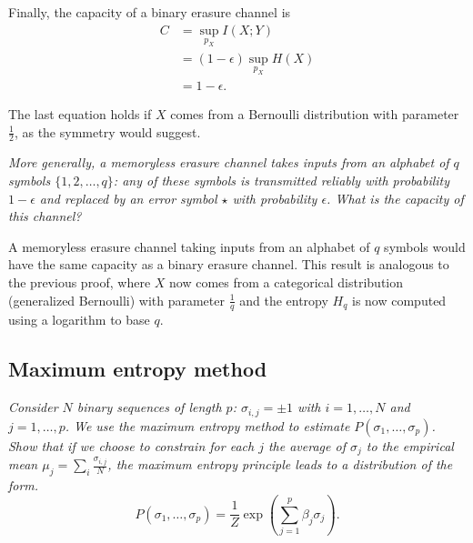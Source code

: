 \documentclass[12pt]{article}
\begin{document}
  Finally, the capacity of a binary erasure channel is
  \begin{equation}
    \begin{split}
      C &= \sup_{p_X} I(X; Y)\\
      &= (1 - \epsilon) \sup_{p_X} H(X)\\
      &= 1 - \epsilon.
    \end{split}
  \end{equation}

  The last equation holds if $X$ comes from a Bernoulli distribution with
  parameter $\frac{1}{2}$, as the symmetry would suggest.

  \begin{displayquote}
    \itshape{}
    More generally, a memoryless erasure channel takes inputs from an alphabet
    of $q$ symbols $\{1, 2, \dots, q\}$: any of these symbols is transmitted
    reliably with probability $1-\epsilon$ and replaced by an error symbol
    $\star$ with probability $\epsilon$. What is the capacity of this channel?
  \end{displayquote}

  A memoryless erasure channel taking inputs from an alphabet of $q$ symbols
  would have the same capacity as a binary erasure channel. This result is
  analogous to the previous proof, where $X$ now comes from a categorical
  distribution (generalized Bernoulli) with parameter $\frac{1}{q}$ and the
  entropy $H_q$ is now computed using a logarithm to base $q$.

  \subsection{Maximum entropy method}

  \begin{displayquote}
    \itshape{}
    Consider $N$ binary sequences of length $p$: $\sigma_{i, j} = \pm 1$ with
    $i = 1, \dots, N$ and $j = 1, \dots , p$. We use the maximum entropy method
    to estimate $P(\sigma_1, \dots, \sigma_p)$. Show that if we choose to
    constrain for each $j$ the average of $\sigma_j$ to the empirical mean
    $\mu_j = \sum_i \frac{\sigma_{i, j}}{N}$, the maximum entropy principle
    leads to a distribution of the form.
    \begin{equation}
      P(\sigma_1, \dots, \sigma_p) = \frac{1}{Z}\exp\left(\sum_{j = 1}^p \beta_j
        \sigma_j\right).
    \end{equation}
  \end{displayquote}
\end{document}
